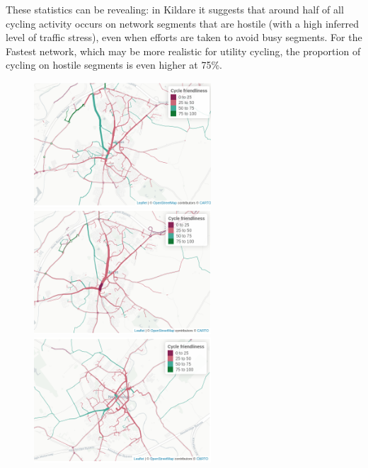 \documentclass[
  super,
  preprint,
  3p]{elsarticle}
\begin{document}
These statistics can be revealing: in Kildare it suggests that around
half of all cycling activity occurs on network segments that are hostile
(with a high inferred level of traffic stress), even when efforts are
taken to avoid busy segments. For the Fastest network, which may be more
realistic for utility cycling, the proportion of cycling on hostile
segments is even higher at 75\%.

\begin{figure}

\begin{minipage}{0.50\linewidth}
\includegraphics[width=2.60417in,height=\textheight]{images/naas_quietest_godutch.png}\end{minipage}%
%
\begin{minipage}{0.50\linewidth}
\includegraphics[width=2.60417in,height=\textheight]{images/naas_fastest_godutch.png}\end{minipage}%
\newline
\begin{minipage}{0.50\linewidth}
\includegraphics[width=2.60417in,height=\textheight]{images/newbridge_quietest_godutch.png}\end{minipage}%

\end{figure}
\end{document}
